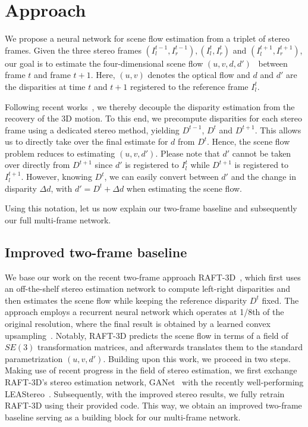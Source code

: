 \documentclass[10pt,twocolumn,letterpaper]{article}
\begin{document}
\section{Approach}
We propose a neural network for scene flow estimation from a triplet of stereo frames.
Given the three stereo frames
$(I^{t-1}_l, I^{t-1}_r), (I^{t}_l, I^{t}_r)$ and $(I^{t+1}_l, I^{t+1}_r)$,
our goal is to estimate the four-dimensional scene flow $(u,v,d,d')$~\cite{Devernay2007_SceneFlow} between frame $t$ and frame $t\!+\!1$.
Here, $(u,v)$ denotes the optical flow and $d$ and $d'$ are the disparities at time $t$ and $t\!+\!1$ registered to the reference frame $I^{t}_l$.

Following recent works~\cite{Badki2021_binaryTTC,Liu2022_camliflow,Teed2021_RAFT3D,Yang2020_opticalexpansion}, we thereby decouple the disparity estimation from the recovery of the 3D motion.
To this end, we precompute disparities for each stereo frame using a dedicated stereo method, yielding $D^{t-1}$, $D^t$ and $D^{t+1}$.
This allows us to directly take over the final estimate for $d$ from $D^t$.
Hence, the scene flow problem reduces to estimating $(u,v,d')$.
Please note that $d'$ cannot be taken over directly from $D^{t+1}$ since $d'$ is registered to $I^{t}_l$ while $D^{t+1}$ is registered to $I^{t+1}_l$.
However, knowing $D^t$, we can easily convert between $d'$ and the change in disparity $\Delta d$, with $d' = D^t + \Delta d$ when estimating the scene flow.



Using this notation, let us now explain our two-frame baseline and subsequently our full multi-frame network.


\subsection{Improved two-frame baseline}
We base our work on the recent two-frame approach RAFT-3D~\cite{Teed2021_RAFT3D}, which first uses an off-the-shelf stereo estimation network to compute left-right disparities and then estimates the scene flow while keeping the reference disparity $D^t$ fixed.
The approach employs a recurrent neural network which operates at 1/8th of the original resolution, where the final result is obtained by a learned convex upsampling~\cite{Teed2020_RAFT}.
Notably, RAFT-3D predicts the scene flow in terms of a field of $SE(3)$ transformation matrices, and afterwards translates them to the standard parametrization $(u,v,d')$.
Building upon this work, we proceed in two steps.
Making use of recent progress in the field of stereo estimation, we first exchange RAFT-3D's stereo estimation network, GANet~\cite{Zhang2019_GANet} with the recently well-performing LEAStereo~\cite{Cheng2020_LEAStereo}.
Subsequently, with the improved stereo results, we fully retrain RAFT-3D using their provided code.
This way, we obtain an improved two-frame baseline serving as a building block for our multi-frame network.
\end{document}
